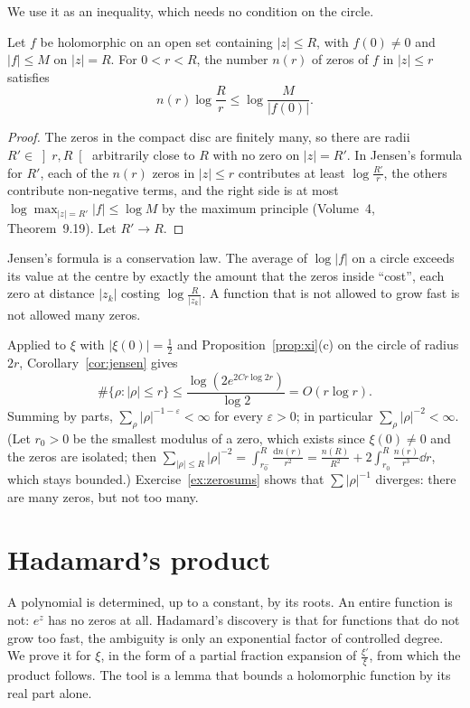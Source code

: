We use it as an inequality, which needs no condition on the circle.

\begin{corollary}\label{cor:jensen}
Let $f$ be holomorphic on an open set containing $|z|\le R$, with $f(0)\ne0$ and $|f|\le M$ on $|z|=R$. For $0<r<R$, the number $n(r)$ of zeros of $f$ in $|z|\le r$ satisfies
\[
n(r)\log\frac Rr\le\log\frac M{|f(0)|}.
\]
\end{corollary}
\begin{proof}
The zeros in the compact disc are finitely many, so there are radii $R'\in\left]r,R\right[$ arbitrarily close to $R$ with no zero on $|z|=R'$. In Jensen's formula for $R'$, each of the $n(r)$
zeros in $|z|\le r$ contributes at least $\log\frac{R'}r$, the others contribute non-negative terms, and the right side is at most $\log\max_{|z|=R'}|f|\le\log M$ by the maximum
principle (Volume~4, Theorem~9.19). Let $R'\to R$.
\end{proof}

\begin{beauty}
Jensen's formula is a conservation law. The average of $\log|f|$ on a circle exceeds its value at the centre by exactly the amount that the zeros inside ``cost'', each zero
at distance $|z_k|$ costing $\log\frac R{|z_k|}$. A function that is not allowed to grow fast is not allowed many zeros.
\end{beauty}

Applied to $\xi$ with $|\xi(0)|=\frac12$ and Proposition~\ref{prop:xi}(c) on the circle of radius $2r$, Corollary~\ref{cor:jensen} gives
\begin{equation}\label{eq:nr}
\#\{\rho:|\rho|\le r\}\le\frac{\log(2e^{2Cr\log2r})}{\log2}=O(r\log r).
\end{equation}
Summing by parts, $\sum_\rho|\rho|^{-1-\varepsilon}<\infty$ for every $\varepsilon>0$; in particular $\sum_\rho|\rho|^{-2}<\infty$. (Let $r_0>0$ be the smallest modulus of a zero, which exists since $\xi(0)\ne0$ and the zeros are isolated; then
$\sum_{|\rho|\le R}|\rho|^{-2}=\int_{r_0^-}^R\frac{\mathrm dn(r)}{r^2}=\frac{n(R)}{R^2}+2\int_{r_0}^R\frac{n(r)}{r^3}\dd r$, which stays bounded.) Exercise~\ref{ex:zerosums} shows that
$\sum|\rho|^{-1}$ diverges: there are many zeros, but not too many.

\section{Hadamard's product}

A polynomial is determined, up to a constant, by its roots. An entire function is not: $e^z$ has no zeros at all. Hadamard's discovery is that for functions that do not
grow too fast, the ambiguity is only an exponential factor of controlled degree. We prove it for $\xi$, in the form of a partial fraction expansion of $\frac{\xi'}\xi$, from
which the product follows. The tool is a lemma that bounds a holomorphic function by its real part alone.

